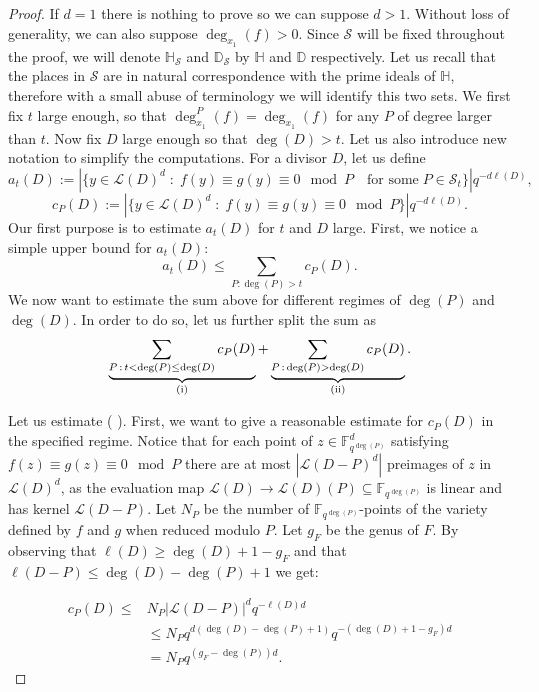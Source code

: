 \documentclass[10pt]{amsart}
\newcommand{\vF}{\mathbb{F}}
\newcommand{\vH}{\mathbb{H}}
\newcommand{\vD}{\mathbb{D}}
\newcommand{\cS}{\mathcal{S}}
\newcommand{\cL}{\mathcal{L}}
\newcommand{\RN}[1]{%
  \textup{\uppercase\expandafter{\romannumeral#1}}%
}
\theoremstyle{definition}
\theoremstyle{remark}
\numberwithin{equation}{section}
\begin{document}
\begin{proof}
If $d=1$  there is nothing to prove so we can suppose $d>1$. Without loss of generality, we can also suppose $\deg_{x_1}(f)>0$.
Since $\cS$ will be fixed throughout the proof, we will denote $\vH_{\cS}$ and $\vD_{\cS}$ by $\vH$ and $\vD$ respectively.
Let us recall that the places in $\cS$ are in natural correspondence with the prime ideals of $\vH$, therefore with a small abuse of terminology we will identify this two sets. 
We first fix $t$ large enough, so that $\deg^P_{x_1}(f)=\deg_{x_1}(f)$ for any $P$ of degree larger than $t$.
Now fix $D$ large enough so that $\deg(D)>t$.
Let us also introduce new notation to simplify the computations. For a divisor $D$, let us define
\[a_t(D):=\left| \{y \in \cL(D)^d \;:\; f(y)\equiv g(y)\equiv 0 \mod P\quad  \text{for some}\; P\in \cS_t \}\right|q^{-d\ell(D)},\]
\[c_P(D):=\left|\{y \in \cL(D)^d\;:\; f(y)\equiv g(y)\equiv 0 \mod P\}\right|q^{-d\ell(D)}.\]
Our first purpose is to estimate $a_t(D)$ for $t$ and $D$ large. 
First, we notice a simple upper bound for $a_t(D)$:
\[a_t(D)\leq \sum_{P:\deg(P)>t} c_P(D).\]
We now want to estimate the sum above for different regimes of $\deg(P)$ and $\deg(D)$. In order to do so,
let us  further  split the sum as 
\begin{equation}\label{splitted_equation}
\underbrace{\sum_{P\, : \, t<\deg(P)\leq \deg(D)} c_P(D)}_{(\RN{1})}+ \underbrace{\sum_{P\, : \, \deg(P)>\deg(D)} c_P(D)}_{(\RN{2})}.
\end{equation}

Let us estimate (\RN{1}). First, we want to give a reasonable estimate for $c_P(D)$ in the specified regime.
Notice that for each point of $z\in \vF^d_{q^{\deg(P)}}$ satisfying $f(z)\equiv g(z)\equiv 0 \mod P$ there are at most
$|\cL(D-P)^d|$ preimages of $z$ in $\cL(D)^d$, as the evaluation map $\cL(D)\rightarrow \cL(D)(P)\subseteq \vF_{q^{\deg(P)}}$ is linear and has kernel $\cL(D-P)$. Let $N_P$ be the number of $\vF_{q^{\deg(P)}}$-points of the variety defined by $f$ and $g$ when reduced modulo $P$. 
Let $g_F$ be the genus of $F$. 
By observing that $\ell(D)\geq \deg(D) + 1 - g_F$ and that $\ell(D-P)\leq \deg(D)-\deg(P)+1$ we get:

\begin{align*}
c_P(D)\leq & N_P |\cL(D-P)|^d q^{-\ell(D)d}\\
 & \leq N_P q^{d(\deg(D)-\deg(P)+1)} q^{-(\deg(D)+1-g_F)d}\\
 & = N_Pq^{(g_F-\deg(P))d}.
\end{align*}



\end{proof}
\end{document}
